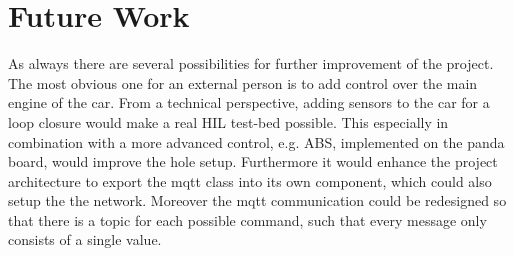 \section{Future Work}
As always there are several possibilities for further improvement of the project.
The most obvious one for an external person is to add control over the main engine of the car.
From a technical perspective, adding sensors to the car for a loop closure would make a real HIL test-bed possible.
This especially in combination with a more advanced control, e.g. ABS, implemented on the panda board, would improve the hole setup.
Furthermore it would enhance the project architecture to export the mqtt class into its own component, which could also setup the the network.
Moreover the mqtt communication could be redesigned so that there is a topic for each possible command, such that every message only consists of a single value. 